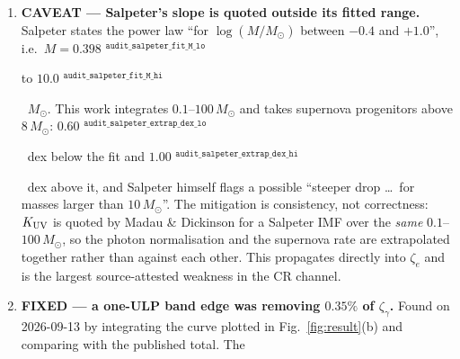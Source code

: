 \documentclass[11pt,a4paper]{article}
\newif\ifprovdraft
\newcommand{\src}[1]{%
  \ifprovdraft
    \ifmmode{}^{\text{\color{gray}\scriptsize\texttt{#1}}}%
    \else{\color{gray}\scriptsize$^{\texttt{#1}}$}%
    \fi
  \fi}
\begin{document}
\begin{enumerate}
{      differential cross section.} \texttt{beb\_sdcs} implements the
      Kim \& Rudd SDCS without the $(1+2t')/(1+t'/2)^2$ factor and the $b'^2$
      term that eq.~(19) carries: an error of
      $1.91$\src{audit\_sdcs\_relfactor\_err\_1e4eV\_pct}\% at $10^4$~eV,
      $15.4$\src{audit\_sdcs\_relfactor\_err\_1e5eV\_pct}\% at $10^5$~eV and
      $25.5$\src{audit\_sdcs\_relfactor\_err\_1e6eV\_pct}\% at $10^6$~eV. It affects
      only the \emph{shape} of the secondary-electron distribution --- the total
      is taken from the relativistic eq.~(20) --- and above $E_{\rm crit}$ the
      cascade is dominated by inverse Compton rather than by knock-on electrons.
      Unquantified before this audit; quantified now, and not yet corrected.
      The same audit corrected a second misnomer here: the function is called
      \texttt{beb\_sdcs}, but it evaluates the dipole term with the real
      Table~I $\mathrm{d}f/\mathrm{d}w$, which makes it the \emph{BED}
      differential cross section, not BEB (which would use
      $\mathrm{d}f/\mathrm{d}w = N/(1+w)^2$). Every caption and footer in this
      document has been corrected to BED and the figures regenerated, because a
      figure whose footer names the wrong model is the defect this project has
      hit most often.
\item \textbf{CAVEAT --- Salpeter's slope is quoted outside its fitted range.}
      Salpeter states the power law ``for $\log(M/M_\odot)$ between $-0.4$ and
      $+1.0$'', i.e.\ $M = 0.398$\src{audit\_salpeter\_fit\_M\_lo} to
      $10.0$\src{audit\_salpeter\_fit\_M\_hi}~$M_\odot$. This work integrates
      $0.1$--$100\,M_\odot$ and takes supernova progenitors above $8\,M_\odot$:
      $0.60$\src{audit\_salpeter\_extrap\_dex\_lo}~dex below the fit and
      $1.00$\src{audit\_salpeter\_extrap\_dex\_hi}~dex above it, and Salpeter
      himself flags a possible ``steeper drop \dots\ for masses larger than
      $10\,M_\odot$''. The mitigation is consistency, not correctness:
      $K_{\rm UV}$ is quoted by Madau \& Dickinson for a Salpeter IMF over the
      \emph{same} $0.1$--$100\,M_\odot$, so the photon normalisation and the
      supernova rate are extrapolated together rather than against each other.
      This propagates directly into $\zeta_e$ and is the largest
      source-attested weakness in the CR channel.
\item \textbf{FIXED --- a one-ULP band edge was removing $0.35\%$ of
      $\zeta_\gamma$.} Found on 2026-09-13 by integrating the curve plotted in
      Fig.~\ref{fig:result}(b) and comparing with the published total. The

\end{enumerate}
\end{document}
